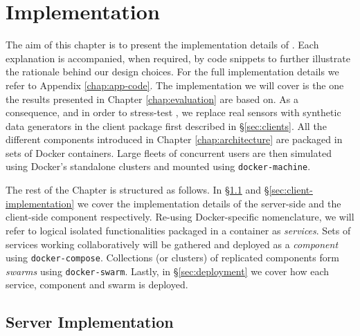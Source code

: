\chapter{Implementation} \label{chap:implementation}

The aim of this chapter is to present the implementation details of \projName.
Each explanation is accompanied, when required, by code snippets to further illustrate the rationale behind our design choices.
For the full implementation details we refer to Appendix \ref{chap:app-code}.
The implementation we will cover is the one the results presented in Chapter \ref{chap:evaluation} are based on.
As a consequence, and in order to stress-test \projName, we replace real sensors with synthetic data generators in the client package first described in \S\ref{sec:clients}.
All the different components introduced in Chapter \ref{chap:architecture} are packaged in sets of Docker containers.
Large fleets of concurrent users are then simulated using Docker's standalone clusters and mounted using \texttt{docker-machine}.

The rest of the Chapter is structured as follows.
In \S\ref{sec:server-implementation} and \S\ref{sec:client-implementation} we cover the implementation details of the server-side and the client-side component respectively.
Re-using Docker-specific nomenclature, we will refer to logical isolated functionalities packaged in a container as \emph{services}.
Sets of services working collaboratively will be gathered and deployed as a \emph{component} using \texttt{docker-compose}.
Collections (or clusters) of replicated components form \emph{swarms} using \texttt{docker-swarm}.
Lastly, in \S\ref{sec:deployment} we cover how each service, component and swarm is deployed.

\section{Server Implementation} \label{sec:server-implementation}

